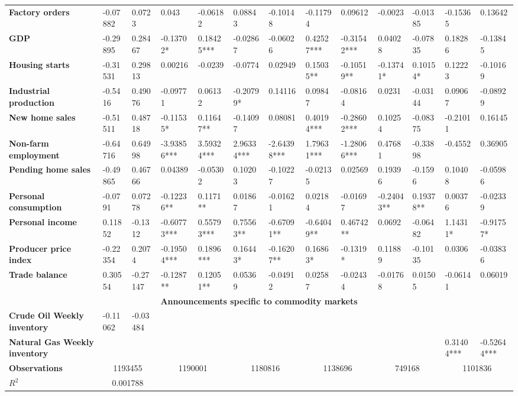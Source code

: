 \begin{sidewaystable}
{\begin{tabular}{@{}lllllllllllll@{}}
\\ \textbf{Factory orders}& -0.07882 & 0.0723 & 0.043 & -0.06182 & 0.08843 & -0.10148 & -0.11794 & 0.09612 & -0.0023 & -0.01385 & -0.15365 & 0.13642 \\ \textbf{GDP}& -0.29895 & 0.28467 & -0.13702* & 0.18425*** & -0.02867 & -0.06026 & 0.42527*** & -0.31542*** & 0.04028 & -0.07835 & 0.18286 & -0.13845 \\ \textbf{Housing starts}& -0.31531 & 0.29813 & 0.00216 & -0.0239 & -0.0774 & 0.02949 & 0.15035** & -0.10519** & -0.13741* & 0.10154* & 0.12223 & -0.10169 \\ \textbf{Industrial production}& -0.5416 & 0.49076 & -0.09771 & 0.06132 & -0.20799* & 0.14116 & 0.09847 & -0.08164 & 0.0231 & -0.03144 & 0.09067 & -0.08929 \\ \textbf{New home sales}& -0.51511 & 0.48718 & -0.11535* & 0.11647** & -0.14097 & 0.08081 & 0.40194*** & -0.28602*** & 0.10254 & -0.08375 & -0.21011 & 0.16145 \\ \textbf{Non-farm employment}& -0.64716 & 0.64998 & -3.93856*** & 3.59324*** & 2.96334*** & -2.64398*** & 1.79631*** & -1.28066*** & 0.47681 & -0.33898 & -0.4552 & 0.36905 \\ \textbf{Pending home sales}& -0.49865 & 0.46766 & 0.04389 & -0.05302 & 0.10203 & -0.10227 & -0.02135 & 0.02569 & 0.19396 & -0.1596 & 0.10408 & -0.05986 \\ \textbf{Personal consumption}& -0.0791 & 0.07278 & -0.12236** & 0.1171** & 0.01867 & -0.01621 & 0.02184 & -0.01697 & -0.24043** & 0.19378** & 0.00376 & -0.02339 \\ \textbf{Personal income}& 0.11852 & -0.1312 & -0.60773*** & 0.55793*** & 0.75563** & -0.67091** & -0.64049** & 0.46742** & 0.0692 & -0.06482 & 1.14311* & -0.91757* \\ \textbf{Producer price index}& -0.22354 & 0.2074 & -0.19504*** & 0.1896*** & 0.16443* & -0.16207** & 0.16863* & -0.1319* & 0.11889 & -0.10135 & 0.0306 & -0.03836 \\ \textbf{Trade balance}& 0.30554 & -0.27147 & -0.1287** & 0.12051** & 0.05369 & -0.04912 & 0.02587 & -0.02434 & -0.01768 & 0.01505 & -0.06141 & 0.06019 \\  \midrule \multicolumn{13}{c}{\textbf{Announcements specific to commodity markets}} \\ \midrule \textbf{Crude Oil Weekly inventory}& -0.11062 & -0.03484 &  &  &  &  &  &  &  &  &  &  \\ \textbf{Natural Gas Weekly inventory}&  &  &  &  &  &  &  &  &  &  & 0.31404*** & -0.52644*** \\  \midrule \textbf{Observations}             &\multicolumn{2}{c}{ 1193455 }                                                 & \multicolumn{2}{c}{ 1190001 }                                                 & \multicolumn{2}{c}{ 1180816 }                                                 & \multicolumn{2}{c}{ 1138696 }                                                 & \multicolumn{2}{c}{ 749168 }                                                   & \multicolumn{2}{c}{ 1101836 }                                                 \\ \textbf{$R^2$}             &\multicolumn{2}{c}{ 0.001788 }  
\end{tabular}}
\end{sidewaystable}
